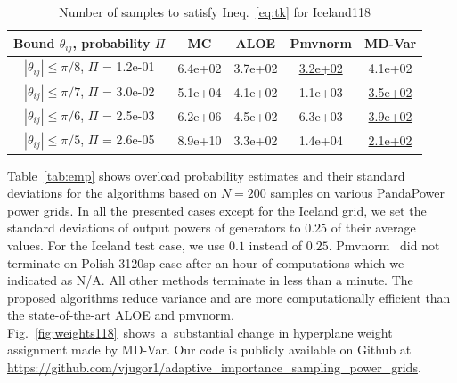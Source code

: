 \begin{table}[ht]
\centering
\captionsetup{justification=centering}
\caption{Number of samples to satisfy Ineq.~\eqref{eq:tk} 
 for Iceland118}
 \begin{tabular}{c|c|c|c|c} 
 \hspace{-2mm}Bound ${\bar\theta}_{ij}$, probability $\Pi$ & MC & ALOE & Pmvnorm & MD-Var\\
 \hline
  \hspace{-2mm}$|{\theta}_{ij}| \le \pi/8$, $\Pi$ = 1.2e-01 & 6.4e+02 & 3.7e+02 & \underline{3.2e+02} & 4.1e+02\\
  \hspace{-2mm}$|{\theta}_{ij}| \le \pi/7$, $\Pi$ = 3.0e-02 & 5.1e+04 & 4.1e+02 & 1.1e+03 & \underline{3.5e+02}\\
  \hspace{-2mm}$|{\theta}_{ij}| \le \pi/6$, $\Pi$ = 2.5e-03  & 6.2e+06 & 4.5e+02 & 6.3e+03 & \underline{3.9e+02} \\
  \hspace{-2mm}$|{\theta}_{ij}| \le \pi/5$, $\Pi$ = 2.6e-05  & 8.9e+10 & 3.3e+02 & 1.4e+04 & \underline{2.1e+02}\\
 \end{tabular}
 \vspace{-3mm}\label{tab:sample-compX}
\end{table}


Table~\ref{tab:emp} shows overload probability estimates and their standard deviations for the algorithms based on $N = 200$ samples on various PandaPower~\cite{pandapower.2018} power grids. In all the presented cases except for the Iceland grid, we set the standard deviations of output powers of generators to $0.25$ of their average values. For the Iceland test case, we use $0.1$ instead of $0.25.$ 
Pmvnorm~\cite{genz2020package} did not terminate on Polish 3120sp case after an hour of computations which we indicated as N/A. All other methods terminate in less than a minute. The proposed algorithms reduce variance and are more computationally efficient than the state-of-the-art ALOE and pmvnorm. Fig.~\ref{fig:weights118}~shows~a~substantial change in hyperplane weight assignment made by MD-Var. Our code is publicly available on Github at \url{https://github.com/vjugor1/adaptive_importance_sampling_power_grids}. 


